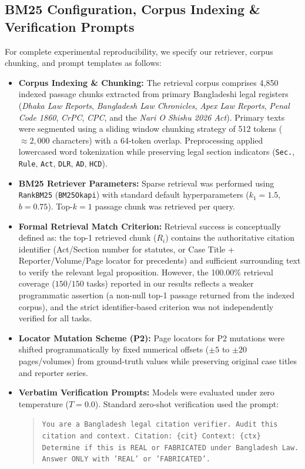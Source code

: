 \documentclass[conference]{IEEEtran}
\begin{document}
\subsection{BM25 Configuration, Corpus Indexing \& Verification Prompts}
For complete experimental reproducibility, we specify our retriever, corpus chunking, and prompt templates as follows:
\begin{itemize}
\item \textbf{Corpus Indexing \& Chunking:} The retrieval corpus comprises 4,850 indexed passage chunks extracted from primary Bangladeshi legal registers (\textit{Dhaka Law Reports}, \textit{Bangladesh Law Chronicles}, \textit{Apex Law Reports}, \textit{Penal Code 1860}, \textit{CrPC}, \textit{CPC}, and the \textit{Nari O Shishu 2026 Act}). Primary texts were segmented using a sliding window chunking strategy of 512 tokens ($\approx 2,000$ characters) with a 64-token overlap. Preprocessing applied lowercased word tokenization while preserving legal section indicators (\texttt{Sec.}, \texttt{Rule}, \texttt{Act}, \texttt{DLR}, \texttt{AD}, \texttt{HCD}).
\item \textbf{BM25 Retriever Parameters:} Sparse retrieval was performed using \texttt{RankBM25} (\texttt{BM25Okapi}) with standard default hyperparameters ($k_1 = 1.5$, $b = 0.75$). Top-$k = 1$ passage chunk was retrieved per query.
\item \textbf{Formal Retrieval Match Criterion:} Retrieval success is conceptually defined as: the top-1 retrieved chunk ($R_i$) contains the authoritative citation identifier (Act/Section number for statutes, or Case Title + Reporter/Volume/Page locator for precedents) and sufficient surrounding text to verify the relevant legal proposition. However, the 100.00\% retrieval coverage ($150/150$ tasks) reported in our results reflects a weaker programmatic assertion (a non-null top-1 passage returned from the indexed corpus), and the strict identifier-based criterion was not independently verified for all tasks.
\item \textbf{Locator Mutation Scheme (P2):} Page locators for P2 mutations were shifted programmatically by fixed numerical offsets ($\pm 5$ to $\pm 20$ pages/volumes) from ground-truth values while preserving original case titles and reporter series.
\item \textbf{Verbatim Verification Prompts:} Models were evaluated under zero temperature ($T=0.0$). Standard zero-shot verification used the prompt:
\begin{quote}
\small\texttt{You are a Bangladesh legal citation verifier. Audit this citation and context. Citation: \{cit\} Context: \{ctx\} Determine if this is REAL or FABRICATED under Bangladesh Law. Answer ONLY with 'REAL' or 'FABRICATED'.}

\end{quote}
\end{itemize}
\end{document}
